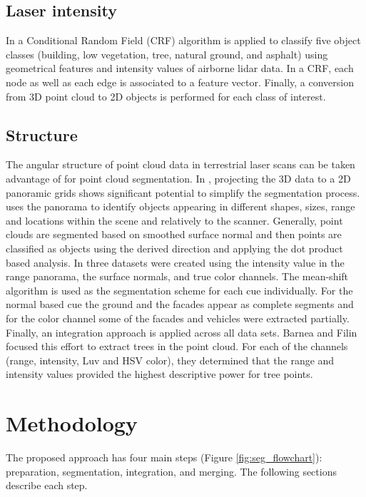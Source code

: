 \documentclass[final,3p,times,twocolumn,authoryear]{elsarticle}
\begin{document}
\subsection{Laser intensity}
In \cite{niemeyer2012} a Conditional Random Field (CRF) algorithm is applied to classify five object classes (building, low vegetation, tree, natural ground, and asphalt) using geometrical features and intensity values of airborne lidar data. In a CRF, each node as well as each edge is associated to a feature vector. Finally, a conversion from 3D point cloud to 2D objects is performed for each class of interest. 


\subsection{Structure}

The angular structure of point cloud data in terrestrial laser scans can be taken advantage of for point cloud segmentation. In \cite{zeibak2009,barnea2012,barnea2013,barnea2008,olsen2010}, projecting the 3D data to a 2D panoramic grids shows significant potential to simplify the segmentation process. \cite{zeibak2009} uses the panorama to identify objects appearing in different shapes, sizes, range and locations within the scene and relatively to the scanner. Generally, point clouds are segmented based on smoothed surface normal and then points are classified as objects using the derived direction and applying the dot product based analysis. In \cite{barnea2013} three datasets were created using the intensity value in the range panorama, the surface normals, and true color channels. The mean-shift algorithm is used as the segmentation scheme for each cue individually. For the normal based cue the ground and the facades appear as complete segments and for the color channel some of the facades and vehicles were extracted partially. Finally, an integration approach is applied across all data sets. Barnea and Filin \cite{barnea2007,barnea2008,barnea2012,barnea2013} focused this effort to extract trees in the point cloud. For each of the channels (range, intensity, Luv and HSV color), they determined that the range and intensity values provided the highest descriptive power for tree points.

\section{Methodology}
\label{seg:method}

The proposed approach has four main steps (Figure \ref{fig:seg_flowchart}):  preparation, segmentation, integration, and merging. The following sections describe each step.
\end{document}
